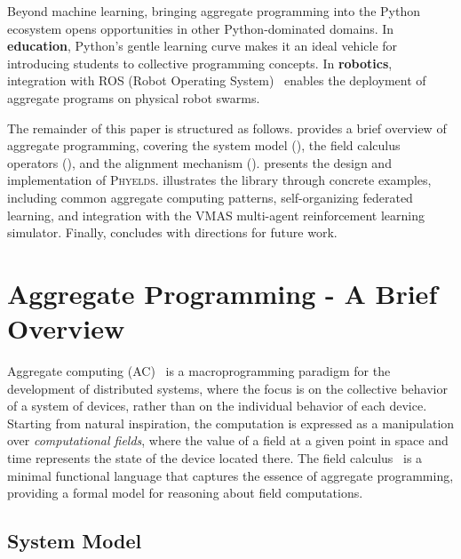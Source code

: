 \documentclass[runningheads]{llncs}
\newcommand{\outline}[1]{%
  \textcolor{blue}{\textit{Outline: #1}}%
}
\begin{document}
Beyond machine learning, bringing aggregate programming into the Python ecosystem opens opportunities in other Python-dominated domains.
%
In \textbf{education}, Python's gentle learning curve makes it an ideal vehicle for introducing students to collective programming concepts.
%
In \textbf{robotics}, integration with ROS (Robot Operating System)~\cite{DBLP:journals/scirobotics/MacenskiFGLW22} enables the deployment of aggregate programs on physical robot swarms.

The remainder of this paper is structured as follows.
 provides a brief overview of aggregate programming,
 covering the system model (),
 the field calculus operators (),
 and the alignment mechanism ().
 presents the design and implementation of \textsc{Phyelds}.
 illustrates the library through concrete examples,
 including common aggregate computing patterns,
 self-organizing federated learning,
 and integration with the VMAS multi-agent reinforcement learning simulator.
 Finally,  concludes with directions for future work.

\section{Aggregate Programming - A Brief Overview}\label{sec:ac-overview}

Aggregate computing (AC)~\cite{DBLP:journals/computer/BealPV15} is a macroprogramming paradigm 
 for the development of distributed systems, 
 where the focus is on the collective behavior of a system of devices, 
 rather than on the individual behavior of each device.
Starting from natural inspiration, 
 the computation is expressed as a manipulation over \emph{computational fields}, 
 where the value of a field at a given point in space and time represents the state of the device located there.
The field calculus~\cite{DBLP:journals/computer/BealPV15} is a minimal functional language 
 that captures the essence of aggregate programming, 
 providing a formal model for reasoning about field computations.
\subsection{System Model}\label{sec:system-model}
\end{document}
